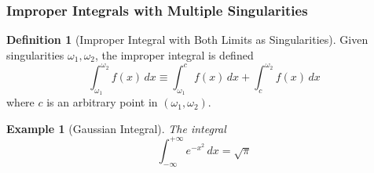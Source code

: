 \documentclass{article}
\newtheorem{example}{Example}[section]
\theoremstyle{remark}
\theoremstyle{definition}
\newtheorem{definition}{Definition}[section]
\begin{document}
\subsubsection{Improper Integrals with Multiple Singularities}

\begin{definition}[Improper Integral with Both Limits as Singularities]
Given singularities $\omega_1, \omega_2$, the improper integral is defined
\[\int_{\omega_1}^{\omega_2} f(x)\,dx \equiv \int_{\omega_1}^c f(x)\,dx + \int_c^{\omega_2} f(x)\,dx\]
where $c$ is an arbitrary point in $(\omega_1, \omega_2)$. 
\end{definition}

\begin{example}[Gaussian Integral]
The integral 
\[\int_{-\infty}^{+\infty} e^{-x^2}\,dx = \sqrt{\pi}\]
\end{example}
\end{document}
